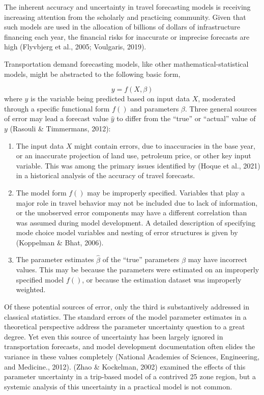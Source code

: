 \documentclass[
  letterpaper,
  number,
  review,
  3p]{elsarticle}
\providecommand{\tightlist}{%
  \setlength{\itemsep}{0pt}\setlength{\parskip}{0pt}}\usepackage{longtable,booktabs,array}
\begin{document}
The inherent accuracy and uncertainty in travel forecasting models is
receiving increasing attention from the scholarly and practicing
community. Given that such models are used in the allocation of billions
of dollars of infrastructure financing each year, the financial risks
for inaccurate or imprecise forecasts are high (Flyvbjerg et al., 2005;
Voulgaris, 2019).

Transportation demand forecasting models, like other
mathematical-statistical models, might be abstracted to the following
basic form,

\[
y = f(X, \beta)
\]where \(y\) is the variable being predicted based on input data \(X\),
moderated through a specific functional form \(f()\) and parameters
\(\beta\). Three general sources of error may lead a forecast value
\(\hat{y}\) to differ from the ``true'' or ``actual'' value of \(y\)
(Rasouli \& Timmermans, 2012):

\begin{enumerate}
\def\labelenumi{\arabic{enumi}.}
\tightlist
\item
  The input data \(X\) might contain errors, due to inaccuracies in the
  base year, or an inaccurate projection of land use, petroleum price,
  or other key input variable. This was among the primary issues
  identified by (Hoque et al., 2021) in a historical analysis of the
  accuracy of travel forecasts.
\item
  The model form \(f()\) may be improperly specified. Variables that
  play a major role in travel behavior may not be included due to lack
  of information, or the unobserved error components may have a
  different correlation than was assumed during model development. A
  detailed description of specifying mode choice model variables and
  nesting of error structures is given by (Koppelman \& Bhat, 2006).
\item
  The parameter estimates \(\hat{\beta}\) of the ``true'' parameters
  \(\beta\) may have incorrect values. This may be because the
  parameters were estimated on an improperly specified model \(f()\), or
  because the estimation dataset was improperly weighted.
\end{enumerate}

Of these potential sources of error, only the third is substantively
addressed in classical statistics. The standard errors of the model
parameter estimates in a theoretical perspective address the parameter
uncertainty question to a great degree. Yet even this source of
uncertainty has been largely ignored in transportation forecasts, and
model development documentation often elides the variance in these
values completely (National Academies of Sciences, Engineering, and
Medicine., 2012). (Zhao \& Kockelman, 2002) examined the effects of this
parameter uncertainty in a trip-based model of a contrived 25 zone
region, but a systemic analysis of this uncertainty in a practical model
is not common.
\end{document}
